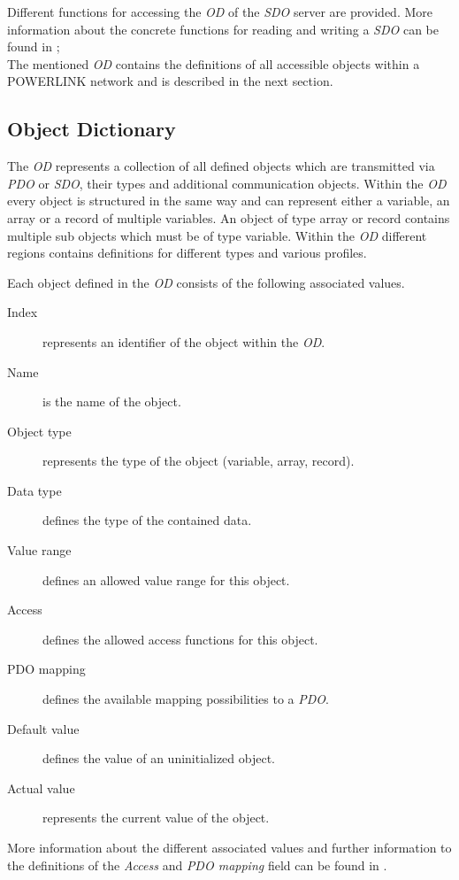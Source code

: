 Different functions for accessing the \emph{OD} of the \emph{SDO} server are provided.
More information about the concrete functions for reading and writing a \emph{SDO} can be found in \cite[section 6.3.2.4.2]{epsg_epsg_2013};
\\

The mentioned \emph{OD} contains the definitions of all accessible objects within a POWERLINK network and is described in the next section.

\subsection{Object Dictionary}
\label{sec:oplk_powerlink_object_dictionary}
The \emph{OD} represents a collection of all defined objects which are transmitted via \emph{PDO} or \emph{SDO}, their types and additional communication objects.
Within the \emph{OD} every object is structured in the same way and can represent either a variable, an array or a record of multiple variables.
An object of type array or record contains multiple sub objects which must be of type variable.
Within the \emph{OD} different regions contains definitions for different types and various profiles. \cite[section 2.2.2]{epsg_epsg_2013}

Each object defined in the \emph{OD} consists of the following associated values.

\begin{description}
    \item[Index] represents an identifier of the object within the \emph{OD}.
    \item[Name] is the name of the object.
    \item[Object type] represents the type of the object (variable, array, record).
    \item[Data type] defines the type of the contained data.
    \item[Value range] defines an allowed value range for this object.
    \item[Access] defines the allowed access functions for this object.
    \item[PDO mapping] defines the available mapping possibilities to a \emph{PDO}.
    \item[Default value] defines the value of an uninitialized object.
    \item[Actual value] represents the current value of the object.
\end{description}

More information about the different associated values and further information to the definitions of the \emph{Access} and \emph{PDO mapping} field can be found in \cite{openpowerlink_od_object}.

